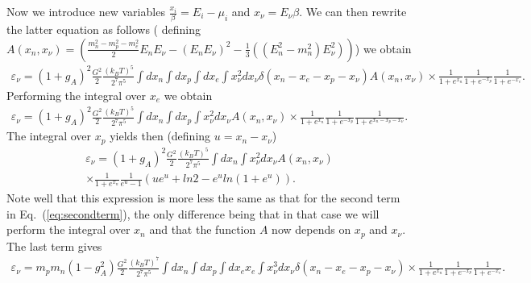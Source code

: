 Now we introduce new variables
$\frac{x_i}{\beta}=E_i-\mu_i$ and $x_{\nu}=E_{\nu}\beta$. We can then rewrite
the latter equation as follows ( defining 
$A(x_n, x_{\nu})=\left(\frac{m_n^2-m_p^2-m_e^2}{2}E_nE_{\nu}  - (E_nE_{\nu})^2-
       \frac{1}{3}((E_n^2-m_n^2)E_{\nu}^2)\right)$)
we obtain
\begin{eqnarray}
      \varepsilon_{\nu}=(1+g_A)^2\frac{G^2}{2}\frac{(k_BT)^5}{2^7\pi^5}
                                 \int dx_n\int dx_p\int dx_e
                                 \int x_{\nu}^2dx_{\nu}
                                 \delta (x_n-x_e-x_p-x_{\nu})A(x_n,x_{\nu})
                                \times\frac{1}{1+e^{x_n}}
                                \frac{1}{1+e^{-x_p}}
                                \frac{1}{1+e^{-x_e}}.
      \label{eq:emis5}
\end{eqnarray}
Performing the integral over $x_e$ we obtain
\begin{eqnarray}
      \varepsilon_{\nu}=(1+g_A)^2\frac{G^2}{2}\frac{(k_BT)^5}{2^7\pi^5}
                                 \int dx_n\int dx_p
                                 \int x_{\nu}^2dx_{\nu}
                                 A(x_n,x_{\nu})
                                \times\frac{1}{1+e^{x_n}}
                                \frac{1}{1+e^{-x_p}}
                                \frac{1}{1+e^{x_n-x_p-x_{\nu}}}.
      \label{eq:emis6}
\end{eqnarray}
The integral over $x_p$ yields then (defining $u=x_n-x_{\nu}$) 
\begin{eqnarray}
      \varepsilon_{\nu}=(1+g_A)^2\frac{G^2}{2}\frac{(k_BT)^5}{2^7\pi^5}
                                 \int dx_n\int x_{\nu}^2dx_{\nu}
                                 A(x_n,x_{\nu})\nonumber\\
                                \times\frac{1}{1+e^{x_n}}\frac{1}{e^{u}-1}
                                \left(ue^u+ln2-e^uln(1+e^u)\right).
      \label{eq:emis7}
\end{eqnarray}
Note well that this expression is more less the same as that for 
the second term in Eq.\ (\ref{eq:secondterm}), the only difference
being that in that case we will perform the integral over $x_n$ and that
the function $A$ now depends on $x_p$ and $x_{\nu}$. The last term 
gives
\begin{eqnarray}
      \varepsilon_{\nu}=m_pm_n(1-g_A^2)\frac{G^2}{2}\frac{(k_BT)^7}{2^7\pi^5}
                                 \int dx_n\int dx_p\int dx_ex_e
                                 \int x_{\nu}^3dx_{\nu}
                                 \delta (x_n-x_e-x_p-x_{\nu})
                                \times\frac{1}{1+e^{x_n}}
                                \frac{1}{1+e^{-x_p}}
                                \frac{1}{1+e^{-x_e}}.
      \label{eq:lastemis1}
\end{eqnarray}
